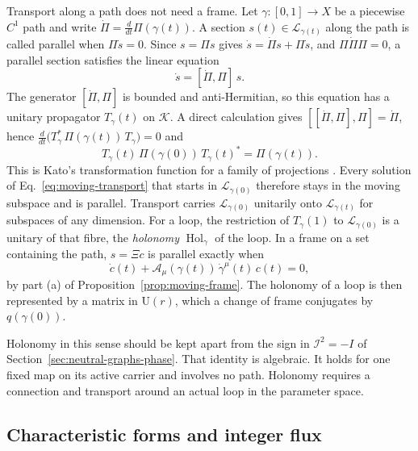 Transport along a path does not need a frame. Let $\gamma:[0,1]\to X$ be a piecewise $C^1$ path and write $\dot\Pi=\frac{d}{dt}\Pi(\gamma(t))$. A section $s(t)\in\mathcal L_{\gamma(t)}$ along the path is called parallel when $\Pi\dot s=0$. Since $s=\Pi s$ gives $\dot s=\dot\Pi s+\Pi\dot s$, and $\Pi\dot\Pi\Pi=0$, a parallel section satisfies the linear equation
\begin{equation}
 \dot s=[\dot\Pi,\Pi]\,s .
 \label{eq:moving-transport}
\end{equation}
The generator $[\dot\Pi,\Pi]$ is bounded and anti-Hermitian, so this equation has a unitary propagator $T_\gamma(t)$ on $\mathcal K$. A direct calculation gives $[[\dot\Pi,\Pi],\Pi]=\dot\Pi$, hence $\frac{d}{dt}\bigl(T_\gamma^*\,\Pi(\gamma(t))\,T_\gamma\bigr)=0$ and
\begin{equation}
 T_\gamma(t)\,\Pi(\gamma(0))\,T_\gamma(t)^*=\Pi(\gamma(t)).
 \label{eq:moving-transport-intertwining}
\end{equation}
This is Kato's transformation function for a family of projections \cite{Kato}. Every solution of Eq.~\eqref{eq:moving-transport} that starts in $\mathcal L_{\gamma(0)}$ therefore stays in the moving subspace and is parallel. Transport carries $\mathcal L_{\gamma(0)}$ unitarily onto $\mathcal L_{\gamma(t)}$ for subspaces of any dimension. For a loop, the restriction of $T_\gamma(1)$ to $\mathcal L_{\gamma(0)}$ is a unitary of that fibre, the \emph{holonomy} $\operatorname{Hol}_\gamma$ of the loop. In a frame on a set containing the path, $s=\Xi c$ is parallel exactly when
\begin{equation}
 \dot c(t)+\mathcal A_\mu(\gamma(t))\,\dot\gamma^\mu(t)\,c(t)=0 ,
 \label{eq:moving-frame-transport}
\end{equation}
by part (a) of Proposition~\ref{prop:moving-frame}. The holonomy of a loop is then represented by a matrix in $\mathrm U(r)$, which a change of frame conjugates by $q(\gamma(0))$.

Holonomy in this sense should be kept apart from the sign in $\mathcal I^2=-I$ of Section~\ref{sec:neutral-graphs-phase}. That identity is algebraic. It holds for one fixed map on its active carrier and involves no path. Holonomy requires a connection and transport around an actual loop in the parameter space.

\subsection{Characteristic forms and integer flux}
\label{subsec:moving-characteristic}

